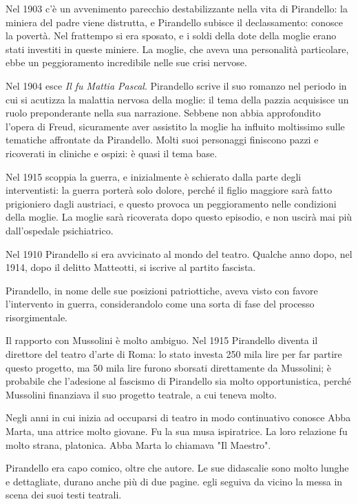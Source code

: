 Nel 1903 c'è un avvenimento parecchio destabilizzante nella vita di Pirandello: la miniera del padre viene distrutta, e Pirandello subisce il declassamento: conosce la povertà. Nel frattempo si era sposato, e i soldi della dote della moglie erano stati investiti in queste miniere.
La moglie, che aveva una personalità particolare, ebbe un peggioramento incredibile nelle sue crisi nervose.

Nel 1904 esce \textit{Il fu Mattia Pascal}. Pirandello scrive il suo romanzo nel periodo in cui si acutizza la malattia nervosa della moglie: il tema della pazzia acquisisce un ruolo preponderante nella sua narrazione.
Sebbene non abbia approfondito l'opera di Freud, sicuramente aver assistito la moglie ha influito moltissimo sulle tematiche affrontate da Pirandello. Molti suoi personaggi finiscono pazzi e ricoverati in cliniche e ospizi: è quasi il tema base.

Nel 1915 scoppia la guerra, e inizialmente è schierato dalla parte degli interventisti: la guerra porterà solo dolore, perché il figlio maggiore sarà fatto prigioniero dagli austriaci, e questo provoca un peggioramento nelle condizioni della moglie.
La moglie sarà ricoverata dopo questo episodio, e non uscirà mai più dall'ospedale psichiatrico.

Nel 1910 Pirandello si era avvicinato al mondo del teatro.
Qualche anno dopo, nel 1914, dopo il delitto Matteotti, si iscrive al partito fascista.

Pirandello, in nome delle sue posizioni patriottiche, aveva visto con favore l'intervento in guerra, considerandolo come una sorta di fase del processo risorgimentale.

Il rapporto con Mussolini è molto ambiguo. Nel 1915 Pirandello diventa il direttore del teatro d'arte di Roma: lo stato investa 250 mila lire per far partire questo progetto, ma 50 mila lire furono sborsati direttamente da Mussolini; è probabile che l'adesione al fascismo di Pirandello sia molto opportunistica, perché Mussolini finanziava il suo progetto teatrale, a cui teneva molto.

Negli anni in cui inizia ad occuparsi di teatro in modo continuativo conosce Abba Marta, una attrice molto giovane. Fu la sua musa ispiratrice.
La loro relazione fu molto strana, platonica. Abba Marta lo chiamava "Il Maestro".

Pirandello era capo comico, oltre che autore. Le sue didascalie sono molto lunghe e dettagliate, durano anche più di due pagine. egli seguiva da vicino la messa in scena dei suoi testi teatrali.

